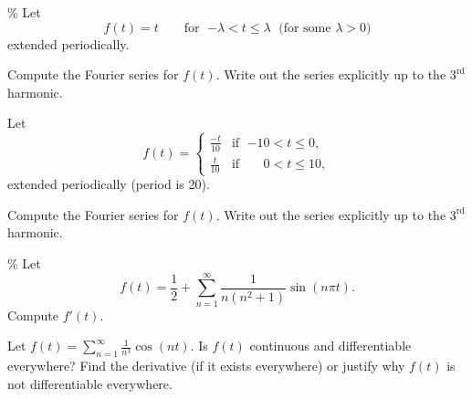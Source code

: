 \documentclass{ximera}
\begin{document}
\begin{exercise}\%
    Let
    \begin{equation*}
        f(t) = t \qquad \text{for } \; {-\lambda} < t \leq \lambda \; \text{ (for some } \lambda > 0 \text{)}
    \end{equation*}
    extended periodically.
    \begin{tasks}
        \task Compute the Fourier series for $f(t)$.
        \task Write out the series explicitly up to the $3^{\text{rd}}$ harmonic.
    \end{tasks}
\end{exercise}

\begin{exercise}
    Let
    \begin{equation*}
        f(t) =
        \begin{cases}
            \frac{-t}{10} & \text{if } \; {-10} < t \leq 0 , \\
            \frac{t}{10} & \text{if } \; \phantom{-1}0 < t \leq  10 ,
        \end{cases}
    \end{equation*}
    extended periodically (period is 20).
    \begin{tasks}
        \task Compute the Fourier series for $f(t)$.
        \task Write out the series explicitly up to the $3^{\text{rd}}$ harmonic.
    \end{tasks}
\end{exercise}

\begin{exercise}\%
    Let
    \begin{equation*}
        f(t) = \frac{1}{2} + \sum_{n=1}^\infty \frac{1}{n(n^2+1)} \sin(n\pi t) .
    \end{equation*}
    Compute $f'(t)$.
\end{exercise}

\begin{exercise}
    Let $f(t) = \sum_{n=1}^\infty \frac{1}{n^3} \cos (n t)$.  Is $f(t)$ continuous and differentiable everywhere?  Find the derivative (if it exists everywhere) or justify why $f(t)$ is not differentiable everywhere.
\end{exercise}
\end{document}

